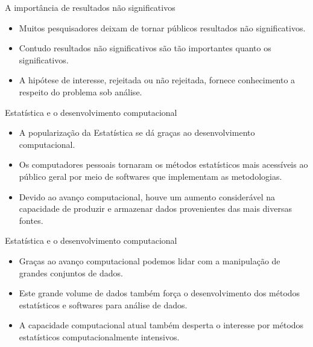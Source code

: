 \documentclass[
  ignorenonframetext,
  serif,
  professionalfont,
  usenames,
  dvipsnames,
  aspectratio = 169]{beamer}
\begin{document}
\begin{frame}{A importância de resultados não significativos}
\protect\hypertarget{a-importuxe2ncia-de-resultados-nuxe3o-significativos}{}
\begin{itemize}
\item
  Muitos pesquisadores deixam de tornar públicos resultados não
  significativos.
\item
  Contudo resultados não significativos são tão importantes quanto os
  significativos.
\item
  A hipótese de interesse, rejeitada ou não rejeitada, fornece
  conhecimento a respeito do problema sob análise.
\end{itemize}
\end{frame}

\begin{frame}{Estatística e o desenvolvimento computacional}
\protect\hypertarget{estatuxedstica-e-o-desenvolvimento-computacional}{}
\begin{itemize}
\item
  A popularização da Estatística se dá graças ao desenvolvimento
  computacional.
\item
  Os computadores pessoais tornaram os métodos estatísticos mais
  acessíveis ao público geral por meio de softwares que implementam as
  metodologias.
\item
  Devido ao avanço computacional, houve um aumento considerável na
  capacidade de produzir e armazenar dados provenientes das mais
  diversas fontes.
\end{itemize}
\end{frame}

\begin{frame}{Estatística e o desenvolvimento computacional}
\protect\hypertarget{estatuxedstica-e-o-desenvolvimento-computacional-1}{}
\begin{itemize}
\item
  Graças ao avanço computacional podemos lidar com a manipulação de
  grandes conjuntos de dados.
\item
  Este grande volume de dados também força o desenvolvimento dos métodos
  estatísticos e softwares para análise de dados.
\item
  A capacidade computacional atual também desperta o interesse por
  métodos estatísticos computacionalmente intensivos.
\end{itemize}
\end{frame}
\end{document}
